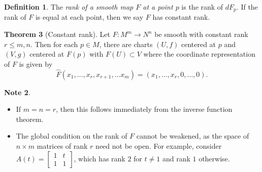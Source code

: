 \documentclass[10pt,letterpaper,cm]{nupset}
\theoremstyle{definition}
\newtheorem{definition}{Definition}[subsection]
\newtheorem{note}[definition]{Note}
\theoremstyle{theorem}
\newtheorem{theorem}[definition]{Theorem}
\theoremstyle{remark}
\newcommand{\1}{\mathbf{1}}
\newcommand{\0}{\vec 0}
\begin{document}
\begin{definition}
The \textit{rank of a smooth map $F$ at a point $p$} is the rank of $dF_p$. If the rank of $F$ is equal at each point, then we say $F$ has constant rank.
\end{definition}

\begin{theorem}[Constant rank]
Let $F: M^m \to N^n$ be smooth with constant rank $r\leq m, n$. Then for each $p\in M$, there are charts $(U, f)$ centered at $p$ and $(V, g)$ centered at $F(p)$ with $F(U) \subset V$ where the coordinate representation of $F$ is given by $$\widehat{F}(x_1, \ldots, x_r, x_{r+1}, \ldots x_m) = (x_1, \ldots, x_r, 0,\ldots, 0).$$
\begin{note} $ $
\begin{itemize}
\item If $m=n =r$, then this follows immediately from the inverse function theorem. 
\item The global condition on the rank of $F$ cannot be weakened, as the space of $n\times m$ matrices of rank $r$ need not be open. For example, consider $A(t) = \begin{bmatrix} 1 & t \\ 1 & 1 \end{bmatrix}$, which has rank $2$ for $t\ne 1$ and rank $1$ otherwise.
\end{itemize}
\end{note}
\end{theorem}
\end{document}
